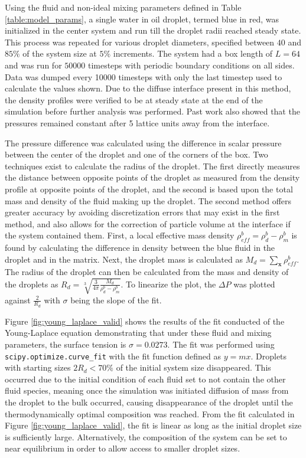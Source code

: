 Using the fluid and non-ideal mixing parameters defined in Table \ref{table:model_params}, a single water in oil 
droplet, termed blue in red, was initialized in the center system and run till the droplet radii reached steady state. 
This process was repeated for various droplet diameters, specified between $40$ and $85 \%$ of the system size at $5\%$ 
increments. The system had a box length of $L = 64$ and was run for $50000$ timesteps with periodic boundary conditions 
on all sides. Data was dumped every 10000 timesteps with only the last timestep used to calculate the values shown. Due 
to the diffuse interface present in this method, the density profiles were verified to be at steady state at the end of 
the simulation before further analysis was performed. \cite{frijters_effects_2012} Past work also showed that the 
pressures remained constant after 5 lattice units away from the interface. \cite{frijters_effects_2012} 

The pressure difference was calculated using the difference in scalar pressure between the center of the droplet and 
one of the corners of the box. Two techniques exist to calculate the radius of the droplet. The first directly measures 
the distance between opposite points of the droplet as measured from the density profile at opposite points of the droplet, 
and the second is based upon the total mass and density of the fluid making up the droplet. The second method offers greater 
accuracy by avoiding discretization errors that may exist in the first method, and also allows for the correction of 
particle volume at the interface if the system contained them. First, a local effective mass density 
$\rho^b_{eff} = \rho^{b}_{d} - \rho^{b}_{m}$ is found by calculating the difference in density between the blue 
fluid in the droplet and in the matrix. Next, the droplet mass is calculated as $M_d = \sum_{\mathbf{x}}{\rho_{eff}^{b}}$. 
The radius of the droplet can then be calculated from the mass and density of the droplets as $R_d = \sqrt[3]{\frac{3}{4\pi} 
\frac{M_d}{\rho^b_d - \rho^b_m}}$. To linearize the plot, the $\Delta P$ was plotted against $\frac{2}{R_d}$ with 
$\sigma$ being the slope of the fit.

Figure \ref{fig:young_laplace_valid} shows the results of the fit conducted of the Young-Laplace equation demonstrating 
that under these fluid and mixing parameters, the surface tension is $\sigma = 0.0273$. The fit was performed using 
\texttt{scipy.optimize.curve\_fit} with the fit function defined as $y = mx$. Droplets with starting sizes $2R_d < 70\%$ 
of the initial system size disappeared. This occurred due to the initial condition of each fluid set to not contain the 
other fluid species, meaning once the simulation was initiated diffusion of mass from the droplet to the bulk occurred, 
causing disappearance of the droplet until the thermodynamically optimal composition was reached. From the fit calculated 
in Figure \ref{fig:young_laplace_valid}, the fit is linear as long as the initial droplet size is sufficiently large. 
Alternatively, the composition of the system can be set to near equilibrium in order to allow access to smaller droplet 
sizes.

